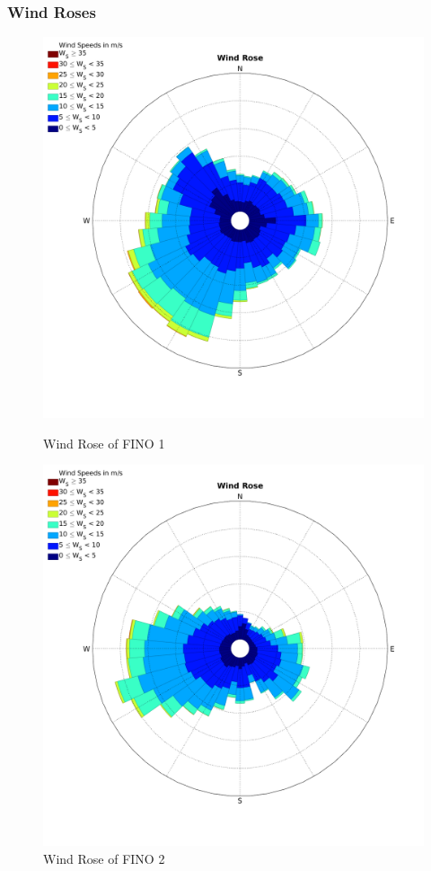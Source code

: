 \documentclass[12pt,t]{beamer}
\begin{document}
\begin{frame}
	\frametitle{Wind Roses}
\begin{figure}[htbp]
	\begin{center}
		\begin{minipage}[t]{0.4\linewidth}
			\centering
			\includegraphics[width=\linewidth]{../../figures/WindRose_Fino1.png}
			\caption{Wind Rose of FINO 1}
			\label{label 1}
		\end{minipage}
		\qquad
		\begin{minipage}[t]{0.4\linewidth}
			\centering
			\includegraphics[width=\linewidth]{../../figures/WindRose_Fino2.png}
			\caption{Wind Rose of FINO 2}
			\label{label 2}
		\end{minipage}
	\end{center}
\end{figure}
\end{frame}
\end{document}
